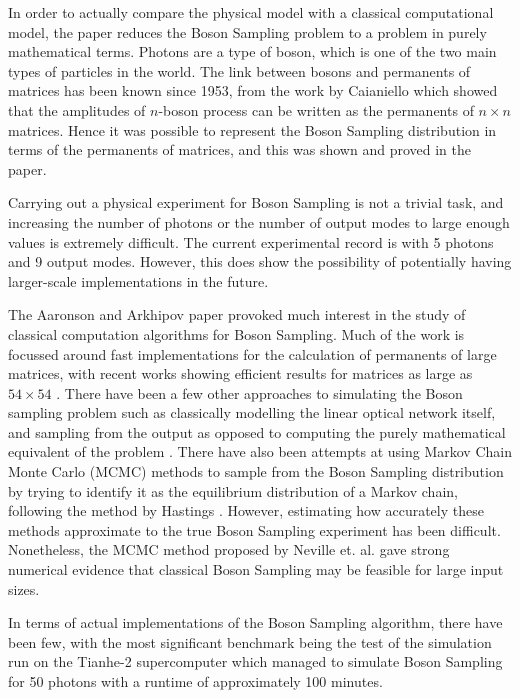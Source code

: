 \documentclass[ %
                    author={Manan Vaswani},
                supervisor={Dr. Raphael Clifford},
                    degree={MEng},
                     title={A multi-core CPU implementation \n of the classical Boson Sampling algorithm},
                  subtitle={},
                      type={},
                      year={2019} ]{dissertation}
\begin{document}
In order to actually compare the physical model with a classical computational model, the paper reduces the Boson Sampling problem to a problem in purely mathematical terms. Photons are a type of boson, which is one of the two main types of particles in the world. The link between bosons and permanents of matrices has been known since 1953, from the work by Caianiello \cite{Caianiello1953} which showed that the amplitudes of $n$-boson process can be written as the permanents of $n \times n$ matrices. Hence it was possible to represent the Boson Sampling distribution in terms of the permanents of matrices, and this was shown and proved in the paper.

Carrying out a physical experiment for Boson Sampling is not a trivial task, and increasing the number of photons or the number of output modes to large enough values is extremely difficult. The current experimental record is with 5 photons and 9 output modes. However, this does show the possibility of potentially having larger-scale implementations in the future.

The Aaronson and Arkhipov paper provoked much interest in the study of classical computation algorithms for Boson Sampling. Much of the work is focussed around fast implementations for the calculation of permanents of large matrices, with recent works showing efficient results for matrices as large as $54 \times 54$ \cite{roga2019, lundow2019}. There have been a few other approaches to simulating the Boson sampling problem such as classically modelling the linear optical network itself, and sampling from the output as opposed to computing the purely mathematical equivalent of the problem \cite{rahimi2016}. There have also been attempts at using Markov Chain Monte Carlo (MCMC) methods to sample from the Boson Sampling distribution by trying to identify it as the equilibrium distribution of a Markov chain, following the method by Hastings \cite{hastings1970}. However, estimating how accurately these methods approximate to the true Boson Sampling experiment has been difficult. Nonetheless, the MCMC method proposed by Neville et. al. \cite{neville2017} gave strong numerical evidence that classical Boson Sampling may be feasible for large input sizes.

In terms of actual implementations of the Boson Sampling algorithm, there have been few, with the most significant benchmark being the test of the simulation run on the Tianhe-2 supercomputer \cite{wu2018} which managed to simulate Boson Sampling for 50 photons with a runtime of approximately 100 minutes.
\end{document}
